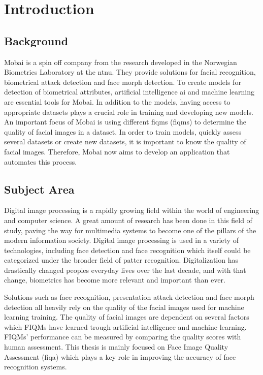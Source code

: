 \chapter{Introduction}
\label{chap:Intro}

\section{Background}
\label{section:background}
Mobai is a spin off company from the research developed in the Norwegian Biometrics Laboratory at the \acrfull{ntnu}. They provide solutions for facial recognition, biometrical attack detection and face morph detection. To create models for detection of biometrical attributes, artificial intelligence \acrshort{ai} and machine learning are essential tools for Mobai. In addition to the models, having access to appropriate datasets plays a crucial role in training and developing new models. An important focus of Mobai is using different \acrlong{fiqm}s (\acrshort{fiqm}s) to determine the quality of facial images in a dataset. In order to train models, quickly assess several datasets or create new datasets, it is important to know the quality of facial images. Therefore, Mobai now aims to develop an application that automates this process. 

\section{Subject Area}
Digital image processing is a rapidly growing field within the world of engineering and computer science. A great amount of research has been done in this field of study, paving the way for multimedia systems to become one of the pillars of the modern information society. Digital image processing is used in a variety of technologies, including face detection and face recognition which itself could be categorized under the broader field of patter recognition. Digitalization has drastically changed peoples everyday lives over the last decade, and with that change, biometrics has become more relevant and important than ever. 

Solutions such as face recognition, presentation attack detection and face morph detection all heavily rely on the quality of the facial images used for machine learning training. The quality of facial images are dependent on several factors which FIQMs have learned trough artificial intelligence and machine learning. FIQMs' performance can be measured by comparing the quality scores with human assessment. This thesis is mainly focused on Face Image Quality Assessment (\acrshort{fiqa}) which plays a key role in improving the accuracy of face recognition systems. 

